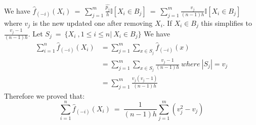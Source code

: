 \documentclass[12pt]{article}
\begin{document}
We have $\hat{f}_{(-i)}(X_i)\ =\ \sum_{j=1}^{m}\frac{\hat{p_j}}{h}\mathbb{I}[X_i \in B_j]\ =\ \sum_{j=1}^{m}\frac{v_j}{(n-1)h}\mathbb{I}[X_i \in B_j]$ where $v_j$ is the new updated one after removing $X_i$.
If $X_i \in B_j$ this simplifies to $\frac{v_j-1}{(n-1)h}$.
Let $S_j\ =\ \{X_i\ ,1\le i \le n|\ X_i \in B_j\}$
We have 
\begin{equation*}
\begin{split}
    \sum_{i=1}^{n}\hat{f}_{(-i)}(X_i) &=  \sum_{j=1}^{m}\sum_{x \in S_j}^{}\hat{f}_{(-i)}(x) \\
                                      &=  \sum_{j=1}^{m}\sum_{x \in S_j}^{}\frac{v_j-1}{(n-1)h} \ where\ |S_j|=v_j\\
                                      &=  \sum_{j=1}^{m}\frac{v_j(v_j-1)}{(n-1)h}
\end{split}
\end{equation*}
Therefore we proved that: 
\begin{equation}
    \boxed{\sum_{i=1}^{n}\hat{f}_{(-i)}(X_i)\ =\ \frac{1}{(n-1)h}\sum_{j=1}^{m}(v_j^2-v_j)}
\end{equation}
\end{document}

